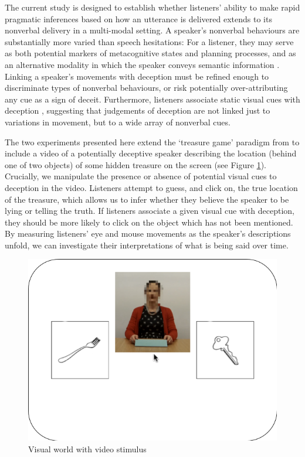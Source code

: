 \documentclass[a4paper,man,natbib]{apa6}
\begin{document}
The current study is designed to establish whether listeners' ability to make rapid pragmatic inferences based on how an utterance is delivered extends to its nonverbal delivery in a multi-modal setting.
A speaker's nonverbal behaviours are substantially more varied than speech hesitations: For a listener, they may serve as both potential markers of metacognitive states and planning processes, and as an alternative modality in which the speaker conveys semantic information \citep[See, e.g.][]{Ekman1969,Mcneill1992}.
Linking a speaker's movements with deception must be refined enough to discriminate types of nonverbal behaviours, or risk potentially over-attributing any cue as a sign of deceit.
Furthermore, listeners associate static visual cues with deception \citep[e.g. eye gaze,][]{Zuckerman1981a}, suggesting that judgements of deception are not linked just to variations in movement, but to a wide array of nonverbal cues. 


The two experiments presented here extend the `treasure game' paradigm from \citet{Loy2017} to include a video of a potentially deceptive speaker describing the location (behind one of two objects) of some hidden treasure on the screen (see Figure \ref{fig:v1_layout}).
Crucially, we manipulate the presence or absence of potential visual cues to deception in the video.
Listeners attempt to guess, and click on, the true location of the treasure, which allows us to infer whether they believe the speaker to be lying or telling the truth.
If listeners associate a given visual cue with deception, they should be more likely to click on the object which has not been mentioned.
By measuring listeners' eye  and mouse movements as the speaker's descriptions unfold, we can investigate their interpretations of what is being said over time.

\begin{figure}[Ht]
  \centering
	\includegraphics[width=\linewidth]{./img/e7_layout.png}
  \caption{Visual world with video stimulus}
  \label{fig:v1_layout}
\end{figure}
\end{document}
